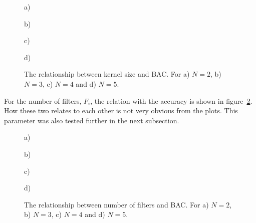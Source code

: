 \begin{figure}[H]
    \centering
    \begin{minipage}{0.42\textwidth}
        
        \hspace{-0.5cm}
        \caption*{a)}
    \end{minipage}
    \begin{minipage}{0.42\textwidth}
        
        \hspace{-0.5cm}
        \caption*{b)}
    \end{minipage}
    \begin{minipage}{0.42\textwidth}
        
        \hspace{-0.5cm}
        \caption*{c)}
    \end{minipage}
    \begin{minipage}{0.42\textwidth}
        
        \hspace{-0.5cm}
        \caption*{d)}
    \end{minipage}
    \captionsetup{width=0.95\linewidth}
    \caption{The relationship between kernel size and BAC. For a) $N=2$, b) $N=3$, c) $N=4$ and d) $N=5$.}
    \label{fig:k_acc}
\end{figure}

For the number of filters, $F_i$, the relation with the accuracy is shown in figure~\ref{fig:f_acc}. How these two relates to each other is not very obvious from the plots. This parameter was also tested further in the next subsection.

\begin{figure}[H]
    \centering
    \begin{minipage}[b]{0.42\textwidth}
        
        \vspace{-0.5cm}
        \caption*{a)}
    \end{minipage}
    \begin{minipage}[b]{0.42\textwidth}
        
        \vspace{-0.5cm}
        \caption*{b)}
    \end{minipage}
    \begin{minipage}[b]{0.42\textwidth}
        
        \vspace{-0.5cm}
        \caption*{c)}
    \end{minipage}
    \begin{minipage}[b]{0.42\textwidth}
        
        \vspace{-0.5cm}
        \caption*{d)}
    \end{minipage}
    \captionsetup{width=0.95\linewidth}
    \caption{The relationship between number of filters and BAC. For a) $N=2$, b) $N=3$, c) $N=4$ and d) $N=5$.}
    \label{fig:f_acc}
\end{figure}

